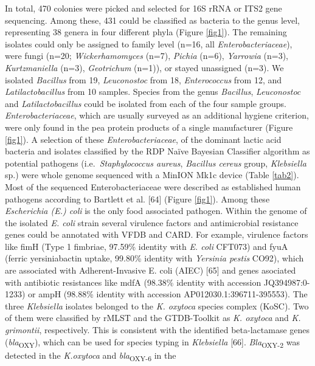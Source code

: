 \documentclass[preprint,3p,
a4paper]{elsarticle} %
\begin{document}
In total, 470 colonies were picked and selected for 16S rRNA or ITS2
gene sequencing. Among these, 431 could be classified as bacteria to the
genus level, representing 38 genera in four different phyla (Figure
\ref{fig1}). The remaining isolates could only be assigned to family
level (n=16, all \emph{Enterobacteriaceae}), were fungi (n=20;
\emph{Wickerhamomyces} (n=7), \emph{Pichia} (n=6), \emph{Yarrowia}
(n=3), \emph{Kurtzmaniella} (n=3), \emph{Geotrichum} (n=1)), or stayed
unassigned (n=3). We isolated \emph{Bacillus} from 19,
\emph{Leuconostoc} from 18, \emph{Enterococcus} from 12, and
\emph{Latilactobacillus} from 10 samples. Species from the genus
\emph{Bacillus}, \emph{Leuconostoc} and \emph{Latilactobacillus} could
be isolated from each of the four sample groups.
\emph{Enterobacteriaceae}, which are usually surveyed as an additional
hygiene criterion, were only found in the pea protein products of a
single manufacturer (Figure \ref{fig1}). A selection of these
\emph{Enterobacteriaceae}, of the dominant lactic acid bacteria and
isolates classified by the RDP Naïve Bayesian Classifier algorithm as
potential pathogens (i.e.~\emph{Staphylococcus aureus}, \emph{Bacillus
cereus} group, \emph{Klebsiella} sp.) were whole genome sequenced with a
MinION Mk1c device (Table \ref{tab2}). Most of the sequenced
Enterobacteriaceae were described as established human pathogens
according to Bartlett et al. {[}64{]} (Figure \ref{fig1}). Among these
\emph{Escherichia (E.) coli} is the only food associated pathogen.
Within the genome of the isolated \emph{E. coli} strain several
virulence factors and antimicrobial resistance genes could be annotated
with VFDB and CARD. For example, virulence factors like fimH (Type 1
fimbriae, 97.59\% identity with \emph{E. coli} CFT073) and fyuA (ferric
yersiniabactin uptake, 99.80\% identity with \emph{Yersinia pestis}
CO92), which are associated with Adherent-Invasive E. coli (AIEC)
{[}65{]} and genes asociated with antibiotic resistances like mdfA
(98.38\% identity with accession JQ394987:0-1233) or ampH (98.88\%
identity with accession AP012030.1:396711-395553). The three
\emph{Klebsiella} isolates belonged to the \emph{K. oxytoca} species
complex (KoSC). Two of them were classified by rMLST and the
GTDB-Toolkit as \emph{K. oxytoca} and \emph{K. grimontii}, respectively.
This is consistent with the identified beta-lactamase genes
(\emph{bla}\textsubscript{OXY}), which can be used for species typing in
\emph{Klebsiella} {[}66{]}. \emph{Bla}\textsubscript{OXY-2} was detected
in the \emph{K.oxytoca} and \emph{bla}\textsubscript{OXY-6} in the
\end{document}
